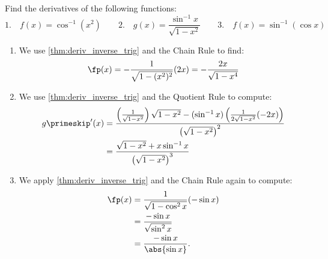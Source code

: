 %

\begin{example}\label{eg_inv_derivs}
Find the derivatives of the following functions:
\[
 \text{1.}\quad f(x)=\cos^{-1}(x^2)\qquad
 \text{2.}\quad g(x)=\frac{\sin^{-1}x}{\sqrt{1-x^2}}\qquad
 \text{3.}\quad f(x)=\sin^{-1}(\cos x)
\]
\solution
\begin{enumerate}
\item We use \autoref{thm:deriv_inverse_trig} and the Chain Rule to find:
\[\fp(x)=-\frac{1}{\sqrt{1-(x^2)^2}}(2x)=- \frac{2x}{\sqrt{1-x^4}}\]
\item We use \autoref{thm:deriv_inverse_trig} and the Quotient Rule to compute: 
\begin{align*}
 g\primeskip'(x)
 &=\frac{\left(\frac 1{\sqrt{1-x^2}}\right)\sqrt{1-x^2} - (\sin^{-1} x)\left( \frac 1{2\sqrt{1-x^2}} (-2x)\right)}{\left(\sqrt{1-x^2}\right)^2}\\
 &=\frac{\sqrt{1-x^2}+x\sin^{-1}x}{\left(\sqrt{1-x^2}\right)^3}
\end{align*}
\item We apply \autoref{thm:deriv_inverse_trig} and the Chain Rule again to compute:
\begin{align*}
 \fp(x)&=\frac{1}{\sqrt{1-\cos^2x}}(-\sin x)\\
 &=\frac{-\sin x}{\sqrt{\sin^2x}}\\
 &=\frac{-\sin x}{\abs{\sin x}}.
\end{align*}
\end{enumerate}
\end{example}

